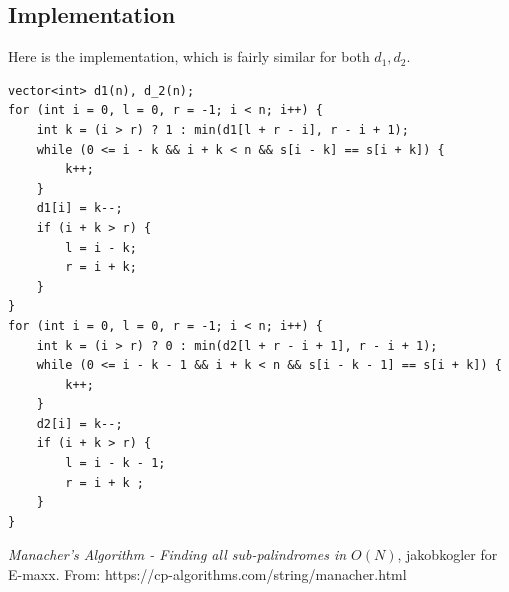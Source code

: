 \documentclass{IEEEtran}
\begin{document}
    \subsection{Implementation}
      Here is the implementation, which is fairly similar for both $d_1,d_2$.
      \begin{lstlisting}
vector<int> d1(n), d_2(n);
for (int i = 0, l = 0, r = -1; i < n; i++) {
    int k = (i > r) ? 1 : min(d1[l + r - i], r - i + 1);
    while (0 <= i - k && i + k < n && s[i - k] == s[i + k]) {
        k++;
    }
    d1[i] = k--;
    if (i + k > r) {
        l = i - k;
        r = i + k;
    }
}
for (int i = 0, l = 0, r = -1; i < n; i++) {
    int k = (i > r) ? 0 : min(d2[l + r - i + 1], r - i + 1);
    while (0 <= i - k - 1 && i + k < n && s[i - k - 1] == s[i + k]) {
        k++;
    }
    d2[i] = k--;
    if (i + k > r) {
        l = i - k - 1;
        r = i + k ;
    }
}
      \end{lstlisting}
  \begin{thebibliography}{}
      \textit{Manacher's Algorithm - Finding all sub-palindromes in $O(N)$},
      jakobkogler for E-maxx.
      From: https://cp-algorithms.com/string/manacher.html
  \end{thebibliography}
\end{document}
